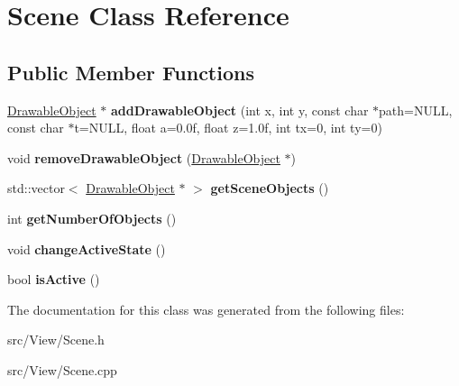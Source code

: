 \hypertarget{classScene}{}\section{Scene Class Reference}
\label{classScene}
\subsection*{Public Member Functions}
\begin{DoxyCompactItemize}
\item 
\hyperlink{classDrawableObject}{Drawable\+Object} $\ast$ {\bfseries add\+Drawable\+Object} (int x, int y, const char $\ast$path=N\+U\+LL, const char $\ast$t=N\+U\+LL, float a=0.\+0f, float z=1.\+0f, int tx=0, int ty=0)\hypertarget{classScene_a962104754fdb9efc987b339ac124f0bd}{}\label{classScene_a962104754fdb9efc987b339ac124f0bd}

\item 
void {\bfseries remove\+Drawable\+Object} (\hyperlink{classDrawableObject}{Drawable\+Object} $\ast$)\hypertarget{classScene_aed48832892c47874a6996a57c5c49d51}{}\label{classScene_aed48832892c47874a6996a57c5c49d51}

\item 
std\+::vector$<$ \hyperlink{classDrawableObject}{Drawable\+Object} $\ast$ $>$ {\bfseries get\+Scene\+Objects} ()\hypertarget{classScene_a30cb2b4641a02432e962e6961b354318}{}\label{classScene_a30cb2b4641a02432e962e6961b354318}

\item 
int {\bfseries get\+Number\+Of\+Objects} ()\hypertarget{classScene_a9764f41b417bf1f2ea4bb752b23ef1c5}{}\label{classScene_a9764f41b417bf1f2ea4bb752b23ef1c5}

\item 
void {\bfseries change\+Active\+State} ()\hypertarget{classScene_a27d5e7909f21726279092d722e095c57}{}\label{classScene_a27d5e7909f21726279092d722e095c57}

\item 
bool {\bfseries is\+Active} ()\hypertarget{classScene_aac02dec89aa4d67ea4187b9decf4f772}{}\label{classScene_aac02dec89aa4d67ea4187b9decf4f772}

\end{DoxyCompactItemize}


The documentation for this class was generated from the following files\+:\begin{DoxyCompactItemize}
\item 
src/\+View/Scene.\+h\item 
src/\+View/Scene.\+cpp\end{DoxyCompactItemize}
